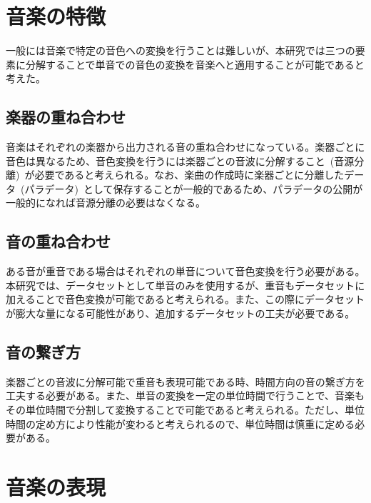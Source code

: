 
\section{音楽の特徴}

一般には音楽で特定の音色への変換を行うことは難しいが、本研究では三つの要素に分解することで単音での音色の変換を音楽へと適用することが可能であると考えた。

\subsection{楽器の重ね合わせ}
    
音楽はそれぞれの楽器から出力される音の重ね合わせになっている。楽器ごとに音色は異なるため、音色変換を行うには楽器ごとの音波に分解すること~(音源分離)~が必要であると考えられる。なお、楽曲の作成時に楽器ごとに分離したデータ~(パラデータ)~として保存することが一般的であるため、パラデータの公開が一般的になれば音源分離の必要はなくなる。

\subsection{音の重ね合わせ}

ある音が重音である場合はそれぞれの単音について音色変換を行う必要がある。本研究では、データセットとして単音のみを使用するが、重音もデータセットに加えることで音色変換が可能であると考えられる。また、この際にデータセットが膨大な量になる可能性があり、追加するデータセットの工夫が必要である。

\subsection{音の繋ぎ方}

楽器ごとの音波に分解可能で重音も表現可能である時、時間方向の音の繋ぎ方を工夫する必要がある。また、単音の変換を一定の単位時間で行うことで、音楽もその単位時間で分割して変換することで可能であると考えられる。ただし、単位時間の定め方により性能が変わると考えられるので、単位時間は慎重に定める必要がある。



\section{音楽の表現}
\label{sec:preprocess}

